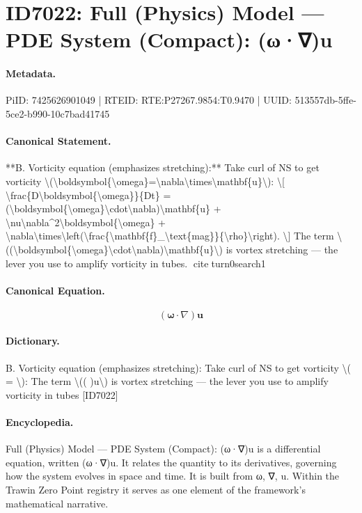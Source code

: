 \section*{ID7022: Full (Physics) Model — PDE System (Compact): (ω·∇)u}
\paragraph{Metadata.}
PiID: 7425626901049 | RTEID: RTE:P27267.9854:T0.9470 | UUID: 513557db-5ffe-5ce2-b990-10c7bad41745

\paragraph{Canonical Statement.}
**B. Vorticity equation (emphasizes stretching):** Take curl of NS to get vorticity \textbackslash{}(\textbackslash{}boldsymbol\{\textbackslash{}omega\}=\textbackslash{}nabla\textbackslash{}times\textbackslash{}mathbf\{u\}\textbackslash{}): \textbackslash{}[ \textbackslash{}frac\{D\textbackslash{}boldsymbol\{\textbackslash{}omega\}\}\{Dt\} = (\textbackslash{}boldsymbol\{\textbackslash{}omega\}\textbackslash{}cdot\textbackslash{}nabla)\textbackslash{}mathbf\{u\} + \textbackslash{}nu\textbackslash{}nabla\textasciicircum{}2\textbackslash{}boldsymbol\{\textbackslash{}omega\} + \textbackslash{}nabla\textbackslash{}times\textbackslash{}left(\textbackslash{}frac\{\textbackslash{}mathbf\{f\}\_\textbackslash{}text\{mag\}\}\{\textbackslash{}rho\}\textbackslash{}right). \textbackslash{}] The term \textbackslash{}((\textbackslash{}boldsymbol\{\textbackslash{}omega\}\textbackslash{}cdot\textbackslash{}nabla)\textbackslash{}mathbf\{u\}\textbackslash{}) is vortex stretching — the lever you use to amplify vorticity in tubes. citeturn0search1

\paragraph{Canonical Equation.}
\[
(\boldsymbol{\omega}\cdot\nabla)\mathbf{u}
\]

\paragraph{Dictionary.}
B. Vorticity equation (emphasizes stretching): Take curl of NS to get vorticity \textbackslash{}( = \textbackslash{}): The term \textbackslash{}(( )u\textbackslash{}) is vortex stretching — the lever you use to amplify vorticity in tubes [ID7022]

\paragraph{Encyclopedia.}
Full (Physics) Model — PDE System (Compact): (ω·∇)u is a differential equation, written (ω·∇)u. It relates the quantity to its derivatives, governing how the system evolves in space and time. It is built from ω, ∇, u. Within the Trawin Zero Point registry it serves as one element of the framework's mathematical narrative.
